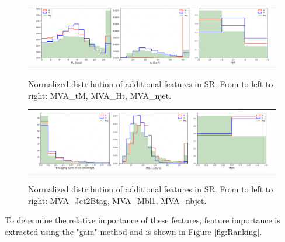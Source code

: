 \begin{figure}[tbh!]
 \begin{center}
 \begin{tabular}{c}
  \includegraphics[width=0.99\textwidth]{figures/Part3/BDT/Features4}\\
 \end{tabular}
 \caption{Normalized distribution of additional features in SR. From to left to right: MVA\_tM, MVA\_Ht, MVA\_njet.}
 \label{fig:Features4}
 \end{center}
\end{figure}

\begin{figure}[tbh!]
 \begin{center}
 \begin{tabular}{c}
  \includegraphics[width=0.99\textwidth]{figures/Part3/BDT/Features5}\\
 \end{tabular}
 \caption{Normalized distribution of additional features in SR. From to left to right: MVA\_Jet2Btag, MVA\_Mbl1, MVA\_nbjet.}
 \label{fig:Features5}
 \end{center}
\end{figure}

To determine the relative importance of these features, feature importance is extracted using the "gain" method and is shown in Figure \ref{fig:Ranking}.

